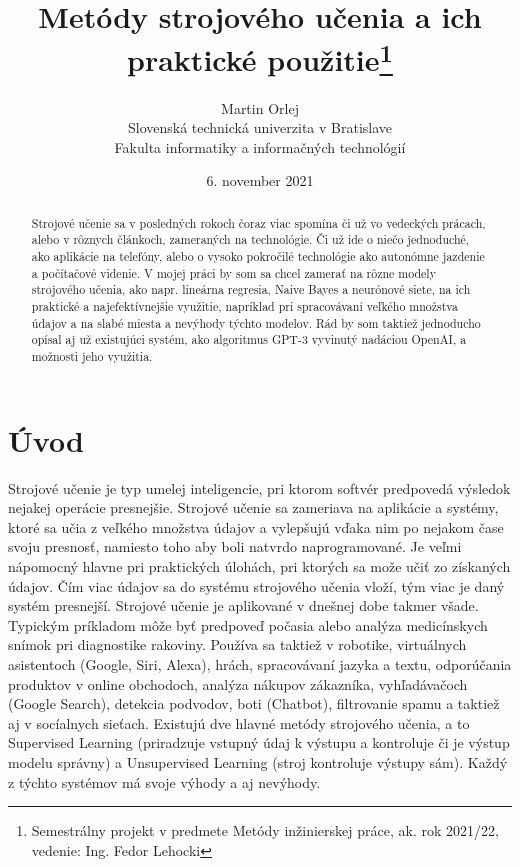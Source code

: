\documentclass[8pt,twoside,slovak,a4paper]{article}
\title{Metódy strojového učenia a ich praktické použitie\thanks{Semestrálny projekt v predmete Metódy inžinierskej práce, ak. rok 2021/22, vedenie: Ing. Fedor Lehocki}}
\author{Martin Orlej\\[2pt]
	{\small Slovenská technická univerzita v Bratislave}\\
	{\small Fakulta informatiky a informačných technológií}\\
	}
\date{\small 6. november 2021}
\begin{document}
\maketitle
\newpage
\begin{abstract}
Strojové učenie sa v posledných rokoch čoraz viac spomína či už vo vedeckých prácach, alebo v rôznych článkoch, zameraných na technológie. Či už ide o niečo jednoduché, ako aplikácie na telefóny, alebo o vysoko pokročilé technológie ako autonómne jazdenie a počítačové videnie.
\newline \hspace*{0.4cm} V mojej práci by som sa chcel zamerať na rôzne modely strojového učenia, ako napr. lineárna regresia, Naive Bayes a neurónové siete, na ich praktické a najefektívnejšie využitie, napríklad pri spracovávaní veľkého množstva údajov a na slabé miesta a nevýhody týchto modelov.
\newline \hspace*{0.4cm} Rád by som taktiež jednoducho opísal aj už existujúci systém, ako algoritmus GPT-3 vyvinutý nadáciou OpenAI, a možnosti jeho využitia.
\end{abstract}
\section{Úvod} \label {uvod}
Strojové učenie je typ umelej inteligencie, pri ktorom softvér predpovedá výsledok nejakej operácie presnejšie. Strojové učenie sa zameriava na aplikácie a systémy, ktoré sa učia z veľkého množstva údajov a vylepšujú vďaka nim po nejakom čase svoju presnosť, namiesto toho aby boli natvrdo naprogramované. Je veľmi nápomocný hlavne pri praktických úlohách, pri ktorých sa može učiť zo získaných údajov. Čím viac údajov sa do systému strojového učenia vloží, tým viac je daný systém presnejší. 
\newline \hspace*{0.4cm}Strojové učenie je aplikované  v dnešnej dobe takmer všade. Typickým príkladom môže byť predpoveď počasia alebo analýza medicínskych snímok pri diagnostike rakoviny. Používa sa taktiež v robotike, virtuálnych asistentoch (Google, Siri, Alexa), hrách, spracovávaní jazyka a textu, odporúčania produktov v online obchodoch, analýza nákupov zákazníka, vyhľadávačoch (Google Search), detekcia podvodov, boti (Chatbot), filtrovanie spamu a taktiež aj v socíalnych sieťach. 
\newline \hspace*{0.4cm}Existujú dve hlavné metódy strojového učenia, a to Supervised Learning (priradzuje vstupný údaj k výstupu a kontroluje či je výstup modelu správny) a Unsupervised Learning (stroj kontroluje výstupy sám). Každý z týchto systémov má svoje výhody a aj nevýhody.
\end{document}
